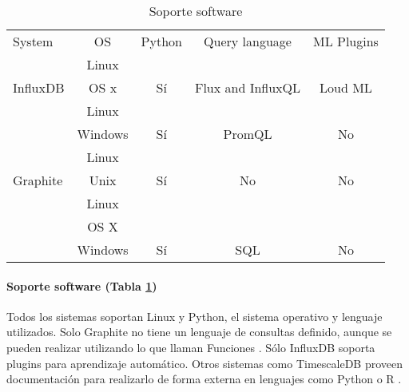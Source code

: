 \begin{table}[H]
    \begin{center}
        \begin{adjustbox}{max width=\textwidth}
            \begin{tabular}{l c c c c}
                \toprule
                System & OS & Python & Query language & ML Plugins\\
                \otoprule
                & Linux &                       &  \\
                \multirow{-2}{*}{InfluxDB} & OS x  & \multirow{-2}{*}{Sí} & \multirow{-2}{*}{Flux and InfluxQL} & \multirow{-2}{*}{Loud ML} \\
                \rowcolor{gray!35}
                                            & Linux   &                        & & \\
                \rowcolor{gray!35}
                \multirow{-2}{*}{Prometheus} & Windows & \multirow{-2}{*}{Sí}  & \multirow{-2}{*}{PromQL} & \multirow{-2}{*}{No}\\
                                        & Linux &                       &  & \\
                \multirow{-2}{*}{Graphite} & Unix  & \multirow{-2}{*}{Sí}  & \multirow{-2}{*}{No} & \multirow{-2}{*}{No} \\
                \rowcolor{gray!35}
                                            & Linux   &                             & & \\
                \rowcolor{gray!35}
                                            & OS X    &                             & & \\
                \rowcolor{gray!35}
                \multirow{-3}{*}{TimescaleDB} & Windows & \multirow{-3}{*}{Sí} & \multirow{-3}{*}{SQL} & \multirow{-3}{*}{No} \\
                \bottomrule
            \end{tabular}
        \end{adjustbox}
        \caption{Soporte software}
        \label{tabla:sssgbd}
    \end{center}
\end{table}

\paragraph{Soporte software (Tabla \ref*{tabla:sssgbd})} Todos los sistemas soportan Linux y Python, el sistema operativo 
y lenguaje utilizados. Solo Graphite no tiene un lenguaje de consultas definido, aunque se pueden realizar utilizando lo que 
llaman Funciones \cite{graphite-functions}. Sólo InfluxDB soporta plugins para aprendizaje automático. Otros sistemas como
TimescaleDB proveen documentación para realizarlo de forma externa en lenguajes como Python o R \cite{timescale-forecasting}.

